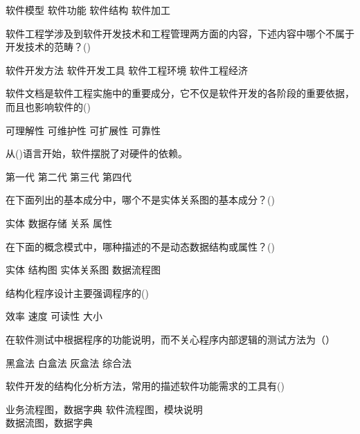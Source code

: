\documentclass[answer]{exam}
\begin{document}
\begin{questions}
\begin{oneparchoices}
		\choice 软件模型
		\choice 软件功能
		\choice 软件结构
		\choice 软件加工
	\end{oneparchoices}
	\question 软件工程学涉及到软件开发技术和工程管理两方面的内容，下述内容中哪个不属于开发技术的范畴？()\\
	\begin{oneparchoices}
		\choice 软件开发方法
		\choice 软件开发工具
		\choice 软件工程环境
		\choice 软件工程经济
	\end{oneparchoices}
	\question 软件文档是软件工程实施中的重要成分，它不仅是软件开发的各阶段的重要依据，而且也影响软件的()\\
	\begin{oneparchoices}
		\choice 可理解性
		\choice 可维护性
		\choice 可扩展性
		\choice 可靠性
	\end{oneparchoices}
	\question 从()语言开始，软件摆脱了对硬件的依赖。\\
	\begin{oneparchoices}
		\choice 第一代
		\choice 第二代
		\choice 第三代
		\choice 第四代
	\end{oneparchoices}
	\question 在下面列出的基本成分中，哪个不是实体关系图的基本成分？()\\
	\begin{oneparchoices}
		\choice 实体
		\choice 数据存储
		\choice 关系
		\choice 属性
	\end{oneparchoices}
	\question 在下面的概念模式中，哪种描述的不是动态数据结构或属性？()\\
	\begin{oneparchoices}
		\choice 实体
		\choice 结构图
		\choice 实体关系图
		\choice 数据流程图
	\end{oneparchoices}
	\question 结构化程序设计主要强调程序的()\\
	\begin{oneparchoices}
		\choice 效率
		\choice 速度
		\choice 可读性
		\choice 大小
	\end{oneparchoices}
	\question 在软件测试中根据程序的功能说明，而不关心程序内部逻辑的测试方法为（）\\
	\begin{oneparchoices}
		\choice 黑盒法
		\choice 白盒法
		\choice 灰盒法
		\choice 综合法
	\end{oneparchoices}
	\question 软件开发的结构化分析方法，常用的描述软件功能需求的工具有()\\
	\begin{oneparchoices}
		\choice 业务流程图，数据字典
		\choice 软件流程图，模块说明\\
		\choice 数据流图，数据字典

\end{oneparchoices}
\end{questions}
\end{document}
